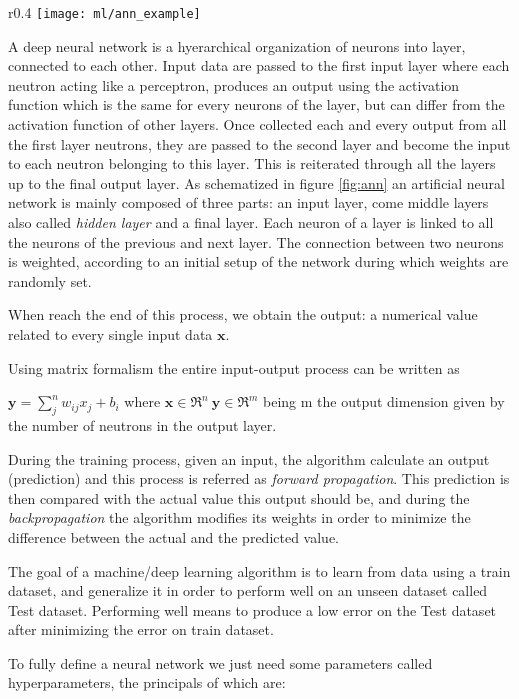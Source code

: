 \documentclass[a4paper,11pt]{article}
\begin{document}
\begin{wrapfigure}{r}{0.4\textwidth}
\centering
\texttt{[image: ml/ann\_example]}
\caption{Artificial Neural Network}
\label{fig:ann}
\end{wrapfigure}


A deep neural network is a hyerarchical organization of neurons into layer, connected to each other.
Input data are passed to the first input layer where each neutron acting like a perceptron, produces an output using the activation function which is the same for every neurons of the layer, but can differ from the activation function of other layers.
Once collected each and every output from all the first layer neutrons, they are passed to the second layer and become the input to each neutron belonging to this layer.
This is reiterated through all the layers up to the final output layer.
As schematized in figure \ref{fig:ann} an artificial neural network is mainly composed of three parts: an input layer, come middle layers also  called \emph{hidden layer} and a final layer. Each neuron of a layer is linked to all the neurons of the previous and next layer.
The connection between two neurons is weighted, according to an initial setup of the network during which weights are randomly set.

When reach the end of this process, we obtain the output: a numerical value related to every single input data $\textbf{x}$.

Using matrix formalism the entire input-output process can be written as

$\textbf{y} = \sum_j^n w_{ij} x_j + b_i $ where $\textbf{x} \in \Re^n \ \textbf{y} \in \Re^m $ being m the output dimension given by the number of neutrons in the output layer.


During the training process, given an input, the algorithm calculate an output (prediction) and this process is referred as  \emph{forward propagation}.
This prediction is then compared with the actual value this output should be, and during the \emph{backpropagation} the algorithm modifies its weights in order to minimize the difference between the actual and the predicted value.

The goal of a machine/deep learning algorithm is to learn from data using a train dataset, and generalize it in order to perform well on an unseen dataset called Test dataset.
Performing well means to produce a low error on the Test dataset after minimizing the error on train dataset.


To fully define a neural network we just need some parameters called hyperparameters, the principals of which are:
\end{document}
